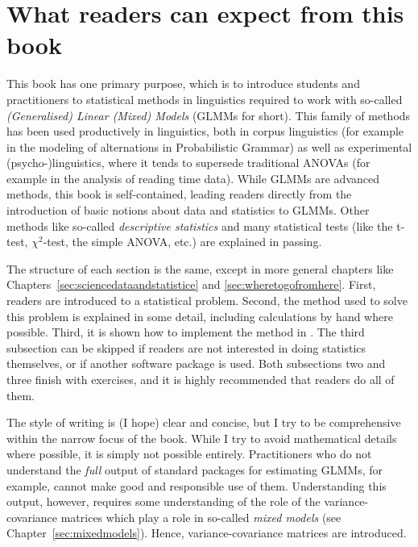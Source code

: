 
\section{What readers can expect from this book}

This book has one primary purpose, which is to introduce students and practitioners to statistical methods in linguistics required to work with so-called \textit{(Generalised) Linear (Mixed) Models} (GLMMs for short).
This family of methods has been used productively in linguistics, both in corpus linguistics (for example in the modeling of alternations in Probabilistic Grammar) as well as experimental (psycho-)linguistics, where it tends to supersede traditional ANOVAs (for example in the analysis of reading time data).
While GLMMs are advanced methods, this book is self-contained, leading readers directly from the introduction of basic notions about data and statistics to GLMMs.
Other methods like so-called \textit{descriptive statistics} and many statistical tests (like the t-test, $\chi^2$-test, the simple ANOVA, etc.) are explained in passing.

The structure of each section is the same, except in more general chapters like Chapters~\ref{sec:sciencedataandstatistice} and \ref{sec:wheretogofromhere}.
First, readers are introduced to a statistical problem.
Second, the method used to solve this problem is explained in some detail, including calculations by hand where possible.
Third, it is shown how to implement the method in .
The third subsection can be skipped if readers are not interested in doing statistics themselves, or if another software package is used.
Both subsections two and three finish with exercises, and it is highly recommended that readers do all of them.

The style of writing is (I hope) clear and concise, but I try to be comprehensive within the narrow focus of the book.
While I try to avoid mathematical details where possible, it is simply not possible entirely.
Practitioners who do not understand the \textit{full} output of standard  packages for estimating GLMMs, for example, cannot make good and responsible use of them.
Understanding this output, however, requires some understanding of the role of the variance-covariance matrices which play a role in so-called \textit{mixed models} (see Chapter~\ref{sec:mixedmodels}).
Hence, variance-covariance matrices are introduced.

